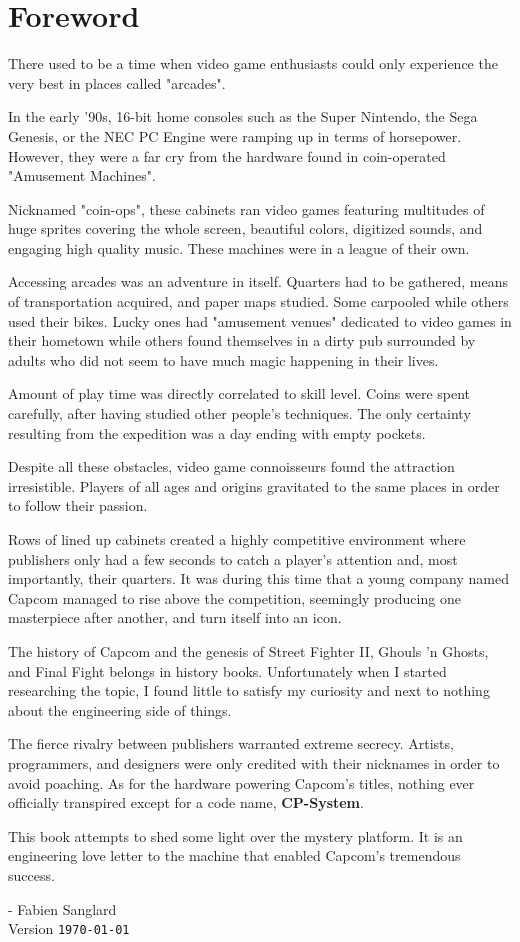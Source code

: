 \chapter*{Foreword}

There used to be a time when video game enthusiasts could only experience the very best in places called "arcades". 

In the early '90s, 16-bit home consoles such as the Super Nintendo, the Sega Genesis, or the NEC PC Engine were ramping up in terms of horsepower. However, they were a far cry from the hardware found in coin-operated "Amusement Machines".

Nicknamed "coin-ops", these cabinets ran video games featuring multitudes of huge sprites covering the whole screen, beautiful colors, digitized sounds, and engaging high quality music. These machines were in a league of their own.

Accessing arcades was an adventure in itself. Quarters had to be gathered, means of transportation acquired, and paper maps studied. Some carpooled while others used their bikes. Lucky ones had "amusement venues" dedicated to video games in their hometown while others found themselves in a dirty pub surrounded by adults who did not seem to have much magic happening in their lives. 

Amount of play time was directly correlated to skill level. Coins were spent carefully, after having studied other people's techniques. The only certainty resulting from the expedition was a day ending with empty pockets. 

Despite all these obstacles, video game connoisseurs found the attraction irresistible. Players of all ages and origins gravitated to the same places in order to follow their passion. 

Rows of lined up cabinets created a highly competitive environment where publishers only had a few seconds to catch a player's attention and, most importantly, their quarters. It was during this time that a young company named Capcom  managed to rise above the competition, seemingly producing one masterpiece after another, and turn itself into an icon.

The history of Capcom and the genesis of Street Fighter II, Ghouls 'n Ghosts, and Final Fight belongs in history books. Unfortunately when I started researching the topic, I found little to satisfy my curiosity and next to nothing about the engineering side of things. 

The fierce rivalry between publishers warranted extreme secrecy. Artists, programmers, and designers were only credited with their nicknames in order to avoid poaching. As for the hardware powering Capcom's titles, nothing ever officially transpired except for a code name, \textbf{CP-System}.

This book attempts to shed some light over the mystery platform. It is an engineering love letter to the machine that enabled Capcom's tremendous success. 

- Fabien Sanglard\\

 Version \texttt{\monthyeardate\today}
